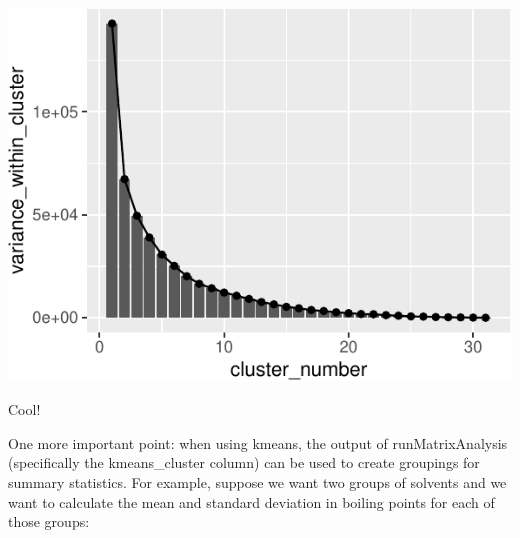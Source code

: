\documentclass[
]{krantz}
\begin{document}
\begin{center}\includegraphics{index_files/figure-latex/unnamed-chunk-106-1} \end{center}

Cool!

One more important point: when using kmeans, the output of runMatrixAnalysis (specifically the kmeans\_cluster column) can be used to create groupings for summary statistics. For example, suppose we want two groups of solvents and we want to calculate the mean and standard deviation in boiling points for each of those groups:
\end{document}
